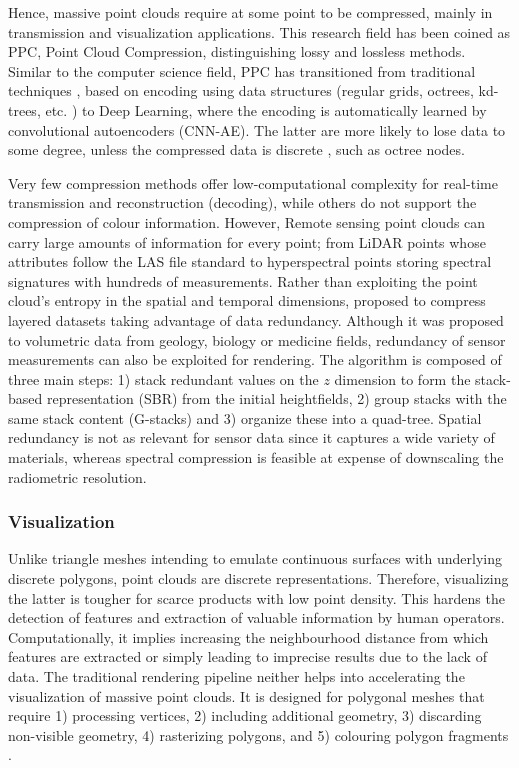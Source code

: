 Hence, massive point clouds require at some point to be compressed, mainly in transmission and visualization applications. This research field has been coined as PPC, Point Cloud Compression, distinguishing lossy and lossless methods. Similar to the computer science field, PPC has transitioned from traditional techniques \cite{bui_comparative_2021}, based on encoding using data structures (regular grids, octrees, kd-trees, etc. \cite{cao_3d_2019}) to Deep Learning, where the encoding is automatically learned by convolutional autoencoders (CNN-AE). The latter are more likely to lose data to some degree, unless the compressed data is discrete \cite{que_voxelcontext-net_2021}, such as octree nodes. 

Very few compression methods offer low-computational complexity for real-time transmission \cite{cao_3d_2019} and reconstruction (decoding), while others do not support the compression of colour information. However, \gls{Remote sensing} point clouds can carry large amounts of information for every point; from LiDAR points whose attributes follow the LAS file standard to hyperspectral points storing spectral signatures with hundreds of measurements. Rather than exploiting the point cloud's entropy in the spatial and temporal dimensions, \cite{graciano_quadstack_2021} proposed to compress layered datasets taking advantage of data redundancy. Although it was proposed to volumetric data from geology, biology or medicine fields, redundancy of sensor measurements can also be exploited for rendering. The algorithm is composed of three main steps: 1) stack redundant values on the $\textit{z}$ dimension to form the stack-based representation (SBR) from the initial heightfields, 2) group stacks with the same stack content (G-stacks) and 3) organize these into a quad-tree. Spatial redundancy is not as relevant for sensor data since it captures a wide variety of materials, whereas spectral compression is feasible at expense of downscaling the radiometric resolution. 

\subsubsection{Visualization}

Unlike triangle meshes intending to emulate continuous surfaces with underlying discrete polygons, point clouds are discrete representations. Therefore, visualizing the latter is tougher for scarce products with low point density. This hardens the detection of features and extraction of valuable information by human operators. Computationally, it implies increasing the neighbourhood distance from which features are extracted or simply leading to imprecise results due to the lack of data. The traditional rendering pipeline neither helps into accelerating the visualization of massive point clouds. It is designed for polygonal meshes that require 1) processing vertices, 2) including additional geometry, 3) discarding non-visible geometry, 4) rasterizing polygons, and 5) colouring polygon fragments \cite{akenine-moller_real-time_2018}.


